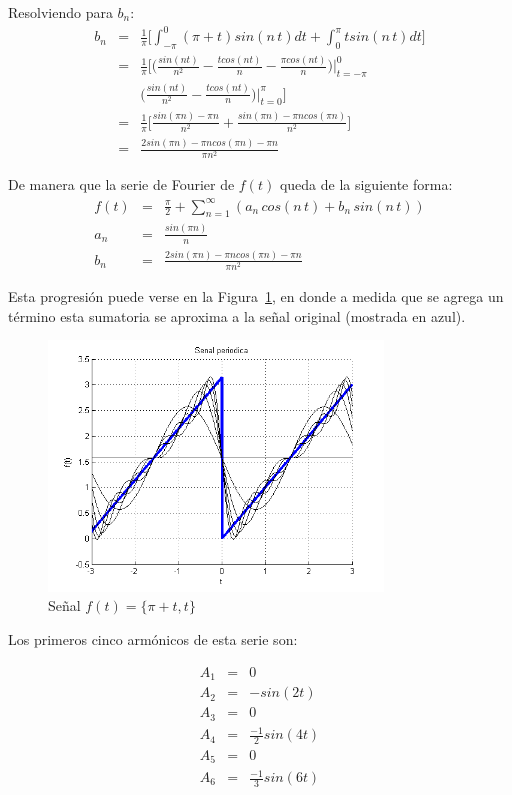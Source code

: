\documentclass[a4paper]{article}
\begin{document}
Resolviendo para $b_n$:
\begin{eqnarray*}
b_n &=&  \frac{1}{\pi} \bigg[ \int_{-\pi}^{0}(\pi + t)sin(n\,t) dt + \int_{0}^{\pi}tsin(n\,t) dt \bigg] \\
&=&  \frac{1}{\pi} \bigg[ \bigg(\frac{sin(n t)}{n^{2}} - \frac{tcos(n t)}{n} - \frac{\pi cos(n t)}{n}\bigg)\bigg|_{t=-\pi}^{0}\\
& & \bigg(\frac{sin(n t)}{n^{2}} - \frac{tcos(n t)}{n}\bigg)\bigg|_{t=0}^{\pi} \bigg] \\
&=& \frac{1}{\pi} \bigg[ \frac{sin(\pi n)-\pi n}{n^{2}} + \frac{sin(\pi n)-\pi n cos(\pi n)}{n^{2}} \bigg]\\
&=& \frac{2sin(\pi n)-\pi n cos(\pi n) - \pi n}{\pi n^{2}}
\end{eqnarray*}

De manera que la serie de Fourier de $f(t)$ queda de la siguiente forma:
\begin{eqnarray*}
f(t) &=& \frac{\pi}{2} + \sum_{n=1}^\infty\left(a_n\,cos(n\,t)+ b_n\,sin(n\,t)\right)\\
a_n &=&  \frac{sin(\pi n)}{n} \\
b_n &=&   \frac{2sin(\pi n)-\pi n cos(\pi n) - \pi n}{\pi n^{2}}
\end{eqnarray*}

Esta progresión puede verse en la Figura~\ref{fig_1d}, en donde a medida que se agrega un término esta sumatoria se aproxima a la señal original (mostrada en azul).

\begin{figure}[!t]
\centering
\includegraphics[width=3.5in]{imgs/piece.png}
\caption{Señal $f(t) = \{ \pi +t, t \}$}
\label{fig_1d}
\end{figure}

Los primeros cinco armónicos de esta serie son:

\begin{eqnarray*}
A_1 &=& 0 \\
A_2 &=& - sin(2t) \\
A_3 &=& 0 \\
A_4 &=& \frac{-1}{2} sin(4t) \\
A_5 &=& 0 \\
A_6 &=& \frac{-1}{3} sin(6t) \\
\end{eqnarray*}
\end{document}
